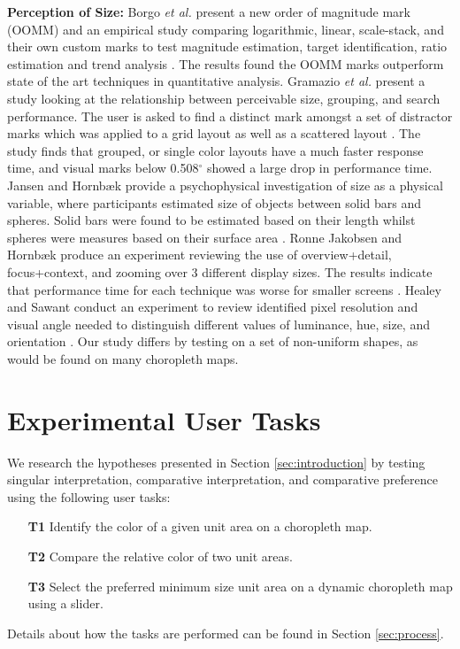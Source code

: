\textbf{Perception of Size:}
Borgo \textit{et al.} present a new order of magnitude mark (OOMM) and an empirical study comparing logarithmic, linear, scale-stack, and their own custom marks to test magnitude estimation, target identification, ratio estimation and trend analysis \cite{borgo2014order}. The results found the  OOMM marks outperform state of the art techniques in quantitative analysis. Gramazio \textit{et al.} present a study looking at the relationship between perceivable size, grouping, and search performance. The user is asked to find a distinct mark amongst a set of distractor marks which was applied to a grid layout as well as a scattered layout \cite{gramazio2014relation}. The study finds that grouped, or single color layouts have a much faster response time, and visual marks below 0.508$^\circ$ showed a large drop in performance time. Jansen and Hornb{\ae}k provide a psychophysical investigation of size as a physical variable, where participants estimated size of objects between solid bars and spheres. Solid bars were found to be estimated based on their length whilst spheres were measures based on their surface area \cite{jansen2016psychophysical}.  Ronne Jakobsen and Hornb{\ae}k produce an experiment reviewing the use of overview+detail, focus+context, and zooming over 3 different display sizes. The results indicate that performance time for each technique was worse for smaller screens \cite{ronne2011sizing}. Healey and Sawant conduct an experiment to review identified pixel resolution and visual angle needed to distinguish different values of luminance, hue, size, and orientation \cite{healey2012on}. Our study differs by testing on a set of non-uniform shapes, as would be found on many choropleth maps.


\section{Experimental User Tasks} \label{sec:tasks}
We research the hypotheses presented in Section \ref{sec:introduction} by testing singular interpretation, comparative interpretation, and comparative preference using the following user tasks:
\begin{itemize}[labelindent=1em, labelsep=0.2cm, leftmargin=*]
\item[\textbf{T1}] Identify the color of a given unit area on a choropleth map.
\item[\textbf{T2}] Compare the relative color of two unit areas.
\item[\textbf{T3}] Select the preferred minimum size unit area on a dynamic choropleth map using a slider.
\end{itemize}
Details about how the tasks are performed can be found in Section \ref{sec:process}.

